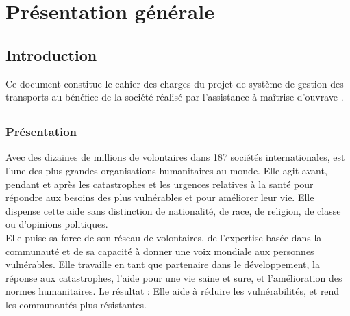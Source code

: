 \chapter{Présentation générale}
\section{Introduction}
Ce document constitue le cahier des charges du projet de système de gestion des transports au bénéfice de la société \mo réalisé par l'assistance à maîtrise d'ouvrave \amo.

\section{\mo}
\subsection{Présentation}
Avec des dizaines de millions de volontaires dans 187 sociétés internationales, \mo est l'une des plus grandes organisations humanitaires au monde. Elle agit avant, pendant et après les catastrophes et les urgences relatives à la santé pour répondre aux besoins des plus vulnérables et pour améliorer leur vie. Elle dispense cette aide sans distinction de nationalité, de race, de religion, de classe ou d'opinions politiques.
\\
Elle puise sa force de son réseau de volontaires, de l'expertise basée dans la communauté et de sa capacité à donner une voix mondiale aux personnes vulnérables. Elle travaille en tant que partenaire dans le développement, la réponse aux catastrophes, l'aide pour une vie saine et sure, et l'amélioration des normes humanitaires. Le résultat : Elle aide à réduire les vulnérabilités, et rend les communautés plus résistantes.

